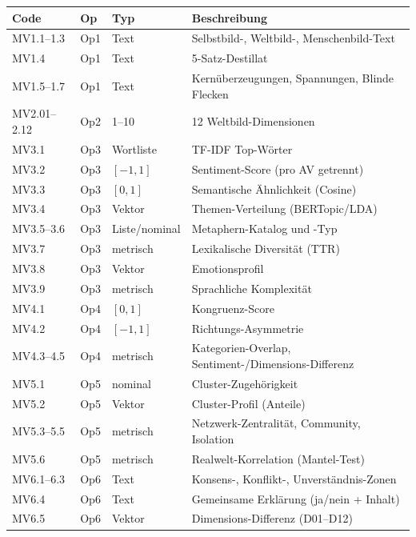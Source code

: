 \documentclass[11pt,a4paper]{article}
\theoremstyle{definition}
\theoremstyle{plain}
\theoremstyle{remark}
\begin{document}
\begin{longtable}{l l l p{6cm}}
  \toprule
  \textbf{Code} & \textbf{Op} & \textbf{Typ} & \textbf{Beschreibung} \\
  \midrule
  \endhead
  MV1.1--1.3 & Op1 & Text & Selbstbild-, Weltbild-, Menschenbild-Text \\
  MV1.4 & Op1 & Text & 5-Satz-Destillat \\
  MV1.5--1.7 & Op1 & Text & Kern\"uberzeugungen, Spannungen, Blinde Flecken \\
  \midrule
  MV2.01--2.12 & Op2 & 1--10 & 12 Weltbild-Dimensionen \\
  \midrule
  MV3.1 & Op3 & Wortliste & TF-IDF Top-W\"orter \\
  MV3.2 & Op3 & $[-1,1]$ & Sentiment-Score (pro AV getrennt) \\
  MV3.3 & Op3 & $[0,1]$ & Semantische \"Ahnlichkeit (Cosine) \\
  MV3.4 & Op3 & Vektor & Themen-Verteilung (BERTopic/LDA) \\
  MV3.5--3.6 & Op3 & Liste/nominal & Metaphern-Katalog und -Typ \\
  MV3.7 & Op3 & metrisch & Lexikalische Diversit\"at (TTR) \\
  MV3.8 & Op3 & Vektor & Emotionsprofil \\
  MV3.9 & Op3 & metrisch & Sprachliche Komplexit\"at \\
  \midrule
  MV4.1 & Op4 & $[0,1]$ & Kongruenz-Score \\
  MV4.2 & Op4 & $[-1,1]$ & Richtungs-Asymmetrie \\
  MV4.3--4.5 & Op4 & metrisch & Kategorien-Overlap, Sentiment-/Dimensions-Differenz \\
  \midrule
  MV5.1 & Op5 & nominal & Cluster-Zugeh\"origkeit \\
  MV5.2 & Op5 & Vektor & Cluster-Profil (Anteile) \\
  MV5.3--5.5 & Op5 & metrisch & Netzwerk-Zentralit\"at, Community, Isolation \\
  MV5.6 & Op5 & metrisch & Realwelt-Korrelation (Mantel-Test) \\
  \midrule
  MV6.1--6.3 & Op6 & Text & Konsens-, Konflikt-, Unverst\"andnis-Zonen \\
  MV6.4 & Op6 & Text & Gemeinsame Erkl\"arung (ja/nein + Inhalt) \\
  MV6.5 & Op6 & Vektor & Dimensions-Differenz (D01--D12) \\
  \bottomrule
\end{longtable}


\end{document}
